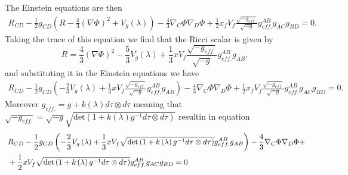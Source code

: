 \documentclass[a4paper,12pt]{article}
\begin{document}
The Einstein equations are then
\begin{align}
R_{CD} - \frac{1}{2} g_{CD} \left( R - \frac{4}{3} {\left( \nabla \Phi \right)}^2 + V_g \left(\lambda\right) \right) - \frac{4}{3} \nabla_C \Phi \nabla_D \Phi + \frac{1}{2} x_f V_f \frac{\sqrt{-g_{eff.}}}{\sqrt{-g}} g_{eff.}^{AB} g_{AC} g_{BD} = 0.
\end{align}
Taking the trace of this equation we find that the Ricci scalar is given by
\begin{equation}
R = \frac{4}{3} {\left( \nabla \Phi \right)}^2 - \frac{5}{3} V_g \left( \lambda \right) + \frac{1}{3} x V_f \frac{\sqrt{-g_{eff.}}}{\sqrt{-g}} g_{eff.}^{AB} g_{AB},
\end{equation}
and substituting it in the Einstein equations we have
\begin{align}
R_{CD} - \frac{1}{2} g_{CD} \left(-\frac{2}{3} V_g \left(\lambda\right) + \frac{1}{3} x V_f \frac{\sqrt{-g_{eff.}}}{\sqrt{-g}} g_{eff.}^{AB} g_{AB} \right) - \frac{4}{3} \nabla_C \Phi \nabla_D \Phi + \frac{1}{2} x_f V_f \frac{\sqrt{-g_{eff.}}}{\sqrt{-g}} g_{eff.}^{AB} g_{AC} g_{BD} = 0.
\end{align}
Moreover $g_{eff.} = g + k\left( \lambda \right) d \tau \otimes d \tau$ meaning that $\sqrt{-g_{eff.}} = \sqrt{-g} \sqrt{\text{det} \left( 1+ k \left( \lambda \right) g^{-1} d \tau \otimes d \tau \right)}$ resultin in equation
\begin{align}
&R_{CD} - \frac{1}{2} g_{CD} \left( - \frac{2}{3} V_g \left( \lambda \right)  + \frac{1}{3} x V_f \sqrt{\text{det} \left( 1+ k \left( \lambda \right) g^{-1} d \tau \otimes d \tau \right)} g_{eff.}^{AB} g_{AB} \right) - \frac{4}{3} \nabla_C \Phi \nabla_D \Phi + \notag \\\ 
&+ \frac{1}{2} x V_f \sqrt{\text{det} \left( 1+ k \left( \lambda \right) g^{-1} d \tau \otimes d \tau \right)} g_{eff.}^{AB} g_{AC} g_{BD} = 0
\end{align}
\end{document}
